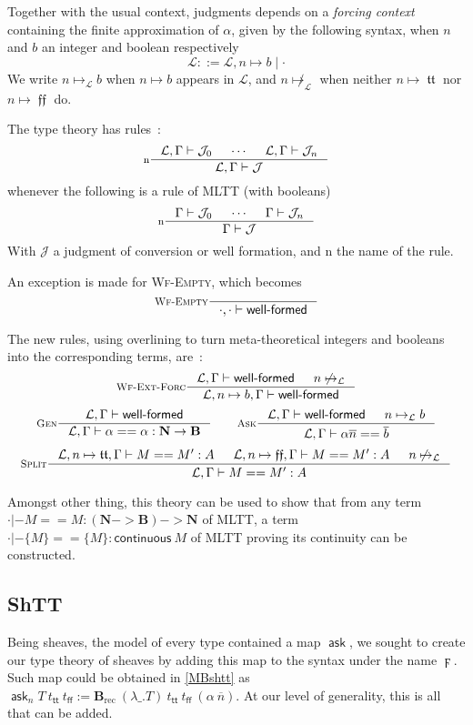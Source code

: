 \documentclass[11pt]{article}
\DeclareMathOperator{\ask}{\mathsf{ask}}
\DeclareMathOperator{\rec}{rec}
\DeclareMathOperator{\true}{\mathsf{tt}}
\DeclareMathOperator{\false}{\mathsf{ff}}
\DeclareMathOperator{\mtrue}{\mathfrak{tt}}
\DeclareMathOperator{\mfalse}{\mathfrak{ff}}
\newcommand{\ovl}{\overline}
\newcommand{\0}{\mathbf{0}}
\newcommand{\1}{\mathbf{1}}
\newcommand{\nat}{\mathbf{N}}
\newcommand{\bool}{\mathbf{B}}
\newcommand{\tctx}{\Gamma}
\newcommand{\Wf}{\textsf{well-formed}}
\newcommand{\fctx}{\mathcal{L}}
\begin{document}
Together with the usual context, judgments depends on a \emph{forcing context} containing the finite approximation of $\alpha$, given by the following syntax, when $n$ and $b$ an integer and boolean respectively
$$ \fctx ::= \fctx, n \mapsto b \mid \cdot$$
We write $n\mapsto_\fctx b$ when $n\mapsto b$ appears in $\fctx$, and $n\not\mapsto_\fctx$ when neither $n\mapsto \mtrue$ nor $n\mapsto \mfalse$ do.

The type theory has rules~:
$$
    \inference[n]{\fctx,\tctx |- \mathcal{J}_0 & \cdots & \fctx,\tctx |- \mathcal{J}_n}{\fctx,\tctx |- \mathcal{J}}
$$
whenever the following is a rule of MLTT (with booleans)
$$
    \inference[n]{\tctx |- \mathcal{J}_0 & \cdots & \tctx |- \mathcal{J}_n}{\tctx |- \mathcal{J}}
$$
With $\mathcal{J}$ a judgment of conversion or well formation, and $\text{n}$ the name of the rule.

An exception is made for \textsc{Wf-Empty}, which becomes
$$
    \inference[\textsc{Wf-Empty}]{}{\cdot,\cdot |- \Wf}
$$

The new rules, using overlining to turn meta-theoretical integers and booleans into the corresponding terms, are~:
$$
    \inference[\textsc{Wf-Ext-Forc}]{\fctx,\tctx |- \Wf & n\not\mapsto_\fctx}{\fctx, n\mapsto b, \tctx |- \Wf}
$$
$$
    \inference[\textsc{Gen}]{\fctx,\tctx|- \Wf}{\fctx,\tctx |- \alpha == \alpha : \nat -> \bool}
    \qquad
    \inference[\textsc{Ask}]{\fctx,\tctx|- \Wf &n\mapsto_\fctx b}{\fctx, \tctx |- \alpha \ovl n == \ovl b}
$$
$$
    \inference[\textsc{Split}]{\fctx,n\mapsto \mtrue,\tctx |-M == M' :A & \fctx, n\mapsto\mfalse, \tctx |- M == M' : A & n\not\mapsto_\fctx}{\fctx,\tctx |- M == M' : A}
$$

Amongst other thing, this theory can be used to show that from any term $\cdot |- M == M : (\nat -> \bool) -> \nat$ of MLTT, a term $\cdot |- \{M\} == \{M\} : \mathsf{continuous}\ M$ of MLTT proving its continuity can be constructed.

\subsection{ShTT}

Being sheaves, the model of every type contained a map $\ask$, we sought to create our type theory of sheaves by adding this map to the syntax under the name $\digamma$. Such map could be obtained in \ref{MBshtt} as $\ask_n T\ t_{\true}\ t_{\false} := \bool_{\rec}\ (\lambda\_.T)\  t_{\true}\ t_{\false}\ (\alpha\ \ovl{n})$. At our level of generality, this is all that can be added.
\end{document}
